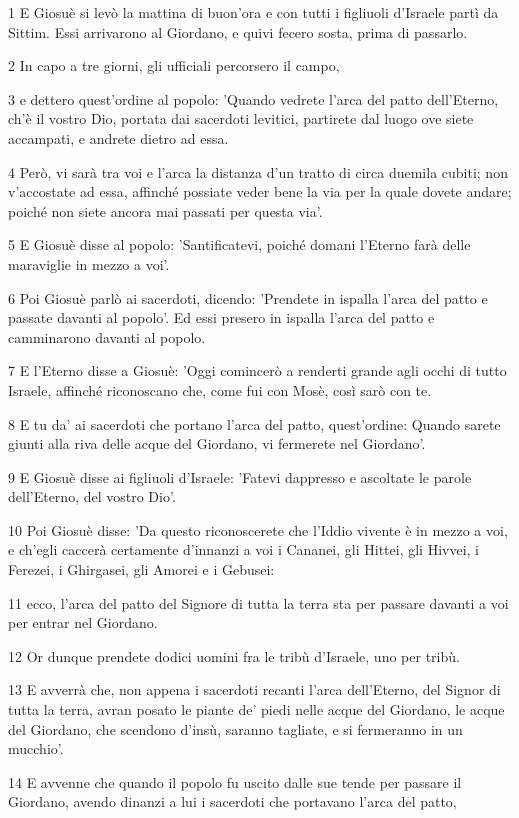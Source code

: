 \par 1 E Giosuè si levò la mattina di buon'ora e con tutti i figliuoli d'Israele partì da Sittim. Essi arrivarono al Giordano, e quivi fecero sosta, prima di passarlo.
\par 2 In capo a tre giorni, gli ufficiali percorsero il campo,
\par 3 e dettero quest'ordine al popolo: 'Quando vedrete l'arca del patto dell'Eterno, ch'è il vostro Dio, portata dai sacerdoti levitici, partirete dal luogo ove siete accampati, e andrete dietro ad essa.
\par 4 Però, vi sarà tra voi e l'arca la distanza d'un tratto di circa duemila cubiti; non v'accostate ad essa, affinché possiate veder bene la via per la quale dovete andare; poiché non siete ancora mai passati per questa via'.
\par 5 E Giosuè disse al popolo: 'Santificatevi, poiché domani l'Eterno farà delle maraviglie in mezzo a voi'.
\par 6 Poi Giosuè parlò ai sacerdoti, dicendo: 'Prendete in ispalla l'arca del patto e passate davanti al popolo'. Ed essi presero in ispalla l'arca del patto e camminarono davanti al popolo.
\par 7 E l'Eterno disse a Giosuè: 'Oggi comincerò a renderti grande agli occhi di tutto Israele, affinché riconoscano che, come fui con Mosè, così sarò con te.
\par 8 E tu da' ai sacerdoti che portano l'arca del patto, quest'ordine: Quando sarete giunti alla riva delle acque del Giordano, vi fermerete nel Giordano'.
\par 9 E Giosuè disse ai figliuoli d'Israele: 'Fatevi dappresso e ascoltate le parole dell'Eterno, del vostro Dio'.
\par 10 Poi Giosuè disse: 'Da questo riconoscerete che l'Iddio vivente è in mezzo a voi, e ch'egli caccerà certamente d'innanzi a voi i Cananei, gli Hittei, gli Hivvei, i Ferezei, i Ghirgasei, gli Amorei e i Gebusei:
\par 11 ecco, l'arca del patto del Signore di tutta la terra sta per passare davanti a voi per entrar nel Giordano.
\par 12 Or dunque prendete dodici uomini fra le tribù d'Israele, uno per tribù.
\par 13 E avverrà che, non appena i sacerdoti recanti l'arca dell'Eterno, del Signor di tutta la terra, avran posato le piante de' piedi nelle acque del Giordano, le acque del Giordano, che scendono d'insù, saranno tagliate, e si fermeranno in un mucchio'.
\par 14 E avvenne che quando il popolo fu uscito dalle sue tende per passare il Giordano, avendo dinanzi a lui i sacerdoti che portavano l'arca del patto,
